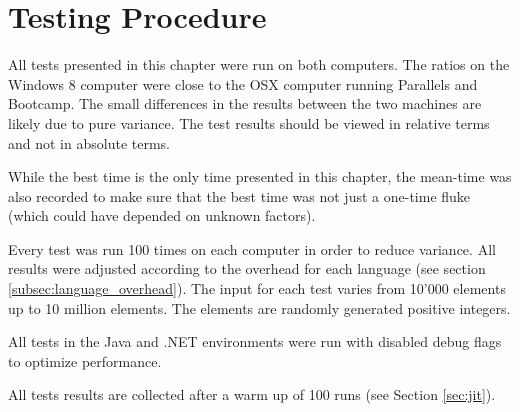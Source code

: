 \section{Testing Procedure}
All tests presented in this chapter were run on both computers. The ratios on the Windows 8 computer were close to the OSX computer running Parallels and Bootcamp. The small differences in the results between the two machines are likely due to pure variance. The test results should be viewed in relative terms and not in absolute terms.

While the best time is the only time presented in this chapter, the mean-time was also recorded to make sure that the best time was not just a one-time fluke (which could have depended on unknown factors).

Every test was run 100 times on each computer in order to reduce variance. All results were adjusted according to the overhead for each language (see section \ref{subsec:language_overhead}). The input for each test varies from 10'000 elements up to 10 million elements. The elements are randomly generated positive integers.

All tests in the Java and .NET environments were run with disabled debug flags to optimize performance.

All tests results are collected after a warm up of 100 runs (see Section \ref{sec:jit}).
